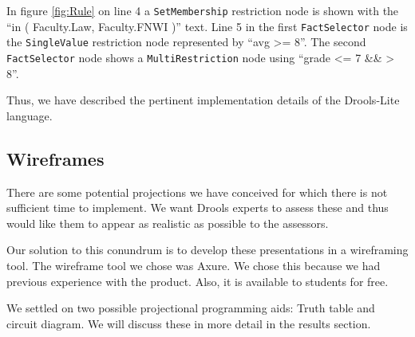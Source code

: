 In figure \ref{fig:Rule} on line 4 a \texttt{SetMembership} restriction node is shown with the ``in ( Faculty.Law, Faculty.FNWI )'' text.
Line 5 in the first \texttt{FactSelector} node is the \texttt{SingleValue} restriction node represented by ``avg >= 8''.
The second \texttt{FactSelector} node shows a \texttt{MultiRestriction} node using ``grade <= 7 \&\& > 8''.

Thus, we have described the pertinent implementation details of the Drools-Lite language.

\subsection{Wireframes}

There are some potential projections we have conceived for which there is not sufficient time to implement.
We want Drools experts to assess these and thus would like them to appear as realistic as possible to the assessors.

Our solution to this conundrum is to develop these presentations in a wireframing tool.
The wireframe tool we chose was Axure\cite{Axure_ProductPage}.
We chose this because we had previous experience with the product.
Also, it is available to students for free.

We settled on two possible projectional programming aids: Truth table and circuit diagram.
We will discuss these in more detail in the results section.

